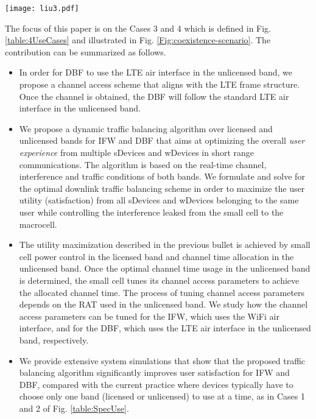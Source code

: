 \documentclass[journal,final,letterpaper,10pt,doublecolumn,twoside]{IEEEtran}
\begin{document}
\begin{figure*}
  \center
  \texttt{[image: liu3.pdf]}
  \caption{Illustration of the Cases 3 and 4 scenarios considered in this paper. } \label{Fig:coexistence-scenario}
\end{figure*}

The focus of this paper is on the Cases 3 and 4 which is defined in Fig. \ref{table:4UseCases} and illustrated in Fig. \ref{Fig:coexistence-scenario}.  The contribution can be summarized as follows.
\begin{itemize}
  \item  In order for DBF to use the LTE air interface in the unlicensed band, we propose a channel access scheme that aligns with the LTE frame structure. Once the channel is obtained, the DBF will follow the standard LTE air interface in the unlicensed band.

  \item  We propose a dynamic traffic balancing algorithm over licensed and unlicensed bands for IFW and DBF that aims at optimizing the overall \emph{user experience} from multiple sDevices and wDevices in short range communications. The algorithm is based on the real-time channel,  interference and traffic
conditions  of both bands. We formulate and solve for the optimal
downlink traffic balancing scheme in order to maximize the user
utility (satisfaction) from all sDevices and wDevices belonging to the same user while controlling the interference leaked from
the small cell to the macrocell.

\item  The utility maximization described in the previous bullet is achieved by small cell power control in
the licensed band and channel time allocation in the unlicensed
band. Once the optimal channel time usage in the unlicensed band is
determined, the small cell tunes its channel access parameters to
achieve the allocated channel time. The process of tuning channel
access parameters depends on the RAT used
in the unlicensed band. We study how the channel access parameters
can be tuned for the IFW, which uses the WiFi air interface, and for the
DBF, which uses the LTE air interface in the unlicensed band,
respectively.

  \item  We provide extensive system simulations that show that the proposed traffic balancing algorithm significantly improves user satisfaction for IFW and DBF, compared with the current practice where
devices typically have to
choose only one band (licensed or unlicensed) to use at a time, as in Cases 1 and 2 of Fig. \ref{table:SpecUse}.
\end{itemize}
\end{document}

